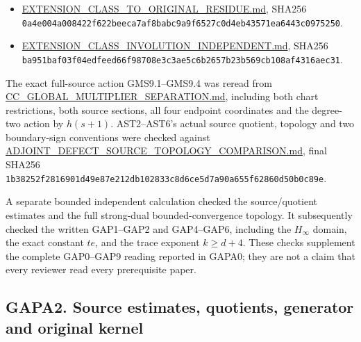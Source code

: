 \begin{itemize}
\tightlist
\item
  \href{https://github.com/KokunoYumeto/zeta-function-research-reader/blob/main/workbenches/splitzero-tandem/continuations/20260925-full-source-tensor-and-original-divisor/gct/EXTENSION_CLASS_TO_ORIGINAL_RESIDUE.md}{EXTENSION\_CLASS\_TO\_ORIGINAL\_RESIDUE.md},
  SHA256
  \texttt{0a4e004a008422f622beeca7af8babc9a9f6527c0d4eb43571ea6443c0975250}.
\item
  \href{https://github.com/KokunoYumeto/zeta-function-research-reader/blob/main/workbenches/splitzero-tandem/continuations/20260925-full-source-tensor-and-original-divisor/gct/EXTENSION_CLASS_INVOLUTION_INDEPENDENT.md}{EXTENSION\_CLASS\_INVOLUTION\_INDEPENDENT.md},
  SHA256
  \texttt{ba951baf03f04edfeed66f98708e3c3ae5c6b2657b23b569cb108af4316aec31}.
\end{itemize}

The exact full-source action GMS9.1--GMS9.4 was reread from
\href{https://github.com/KokunoYumeto/zeta-function-research-reader/blob/36a82ecca98addb8a98b48204e349737856c7223/workbenches/splitzero-tandem/continuations/20260924-cohomology-weight-and-character-lifts/geometric-positive-quotient/sources/programme/cc_sheaf/CC_GLOBAL_MULTIPLIER_SEPARATION.md}{CC\_GLOBAL\_MULTIPLIER\_SEPARATION.md},
including both chart restrictions, both source sections, all four
endpoint coordinates and the degree-two action by \(h(s+1)\).
AST2--AST6's actual source quotient, topology and two boundary-sign
conventions were checked against
\href{https://github.com/KokunoYumeto/zeta-function-research-reader/blob/main/workbenches/splitzero-tandem/continuations/20260925-full-source-tensor-and-original-divisor/gct/ADJOINT_DEFECT_SOURCE_TOPOLOGY_COMPARISON.md}{ADJOINT\_DEFECT\_SOURCE\_TOPOLOGY\_COMPARISON.md},
final SHA256
\texttt{1b38252f2816901d49e87e212db102833c8d6ce5d7a90a655f62860d50b0c89e}.

A separate bounded independent calculation checked the source/quotient
estimates and the full strong-dual bounded-convergence topology. It
subsequently checked the written GAP1--GAP2 and GAP4--GAP6, including
the \(H_\infty\) domain, the exact constant \(te\), and the trace
exponent \(k\ge d+4\). These checks supplement the complete GAP0--GAP9
reading reported in GAPA0; they are not a claim that every reviewer read
every prerequisite paper.

\subsection{GAPA2. Source estimates, quotients, generator and original
kernel}\label{gapa2.-source-estimates-quotients-generator-and-original-kernel}

